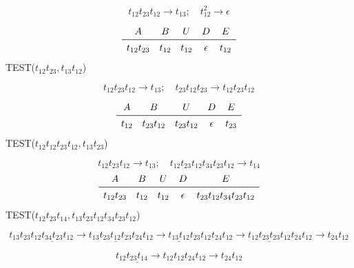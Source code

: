 \documentclass[worked-example]{subfiles}
\begin{document}
\[
t_{12} t_{23} t_{12} \rightarrow t_{13}; \quad
t_{12}^2 \rightarrow \epsilon
\]

\[
\begin{array}{ccccc}
A & B & U & D & E \\
\midrule
t_{12} t_{23} & t_{12} & t_{12} & \epsilon & t_{12}\\
\end{array}
\]
TEST($t_{12} t_{23}, t_{13}t_{12}$)

\[
t_{12} t_{23} t_{12} \rightarrow t_{13}; \quad
t_{23} t_{12} t_{23} \rightarrow t_{12} t_{23} t_{12}
\]

\[
\begin{array}{ccccc}
A & B & U & D & E \\
\midrule
t_{12}  & t_{23}t_{12} & t_{23}t_{12} & \epsilon & t_{23} \\
\end{array}
\]
TEST($t_{12}t_{12} t_{23} t_{12}, t_{13}t_{23}$)

\[
t_{12} t_{23} t_{12} \rightarrow t_{13}; \quad
t_{12} t_{23} t_{12} t_{34} t_{23} t_{12} \rightarrow t_{14}
\]
\[
\begin{array}{ccccc}
A & B & U & D & E \\
\midrule
t_{12} t_{23} & t_{12} & t_{12} & \epsilon & t_{23} t_{12} t_{34} t_{23} t_{12}\\
\end{array}
\]
TEST($t_{12} t_{23} t_{14}, t_{13}t_{23} t_{12} t_{34} t_{23} t_{12}$)

\[
t_{13}t_{23} t_{12} \underline{t_{34} t_{23}} t_{12} \rightarrow
t_{13}\underline{t_{23} t_{12} t_{23}} t_{24} t_{12} \rightarrow
\underline{t_{13} t_{12}} t_{23} t_{12} t_{24} t_{12} \rightarrow
\underline{t_{12} t_{23} t_{23} t_{12}} t_{24} t_{12} \rightarrow t_{24} t_{12}
\]

\[
 t_{12} \underline{t_{23} t_{14}} \rightarrow t_{12} t_{12} t_{24} t_{12} \rightarrow t_{24} t_{12}
\]
\end{document}

